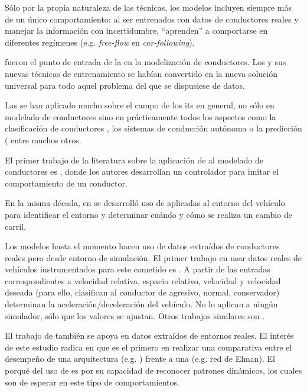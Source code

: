Sólo por la propia naturaleza de las técnicas, los modelos incluyen siempre más de un único comportamiento: al ser entrenados con datos de conductores reales y manejar la información con incertidumbre, \enquote{aprenden} a comportarse en diferentes regímenes (e.g. \textit{\gls{free-flow}} en \textit{\gls{car-following}}).

 fueron el punto de entrada de la  en la modelización de conductores. Los  y sus nuevas técnicas de entrenamiento se habían convertido en la nueva solución universal para todo aquel problema del que se dispusiese de datos.

Las  se han aplicado mucho sobre el campo de los \acrshort{its} en general, no sólo en modelado de conductores sino en prácticamente todos los aspectos como la clasificación de conductores \cite{DiazAlvarez2014}, los sistemas de conducción autónoma \cite{huval2015empirical} o la predicción (\cite{Dougherty1993, chan2012neural} entre muchos otros.

El primer trabajo de la literatura sobre la aplicación de  al modelado de conductores es \cite{Fix1990}, donde los autores desarrollan un controlador para imitar el comportamiento de un conductor.

En la misma década, en \cite{Hunt1994} se desarrolló uso de  aplicadas al entorno del vehículo para identificar el entorno y determinar cuándo y cómo se realiza un cambio de carril.

Los modelos hasta el momento hacen uso de datos extraídos de conductores reales pero desde entorno de simulación. El primer trabajo en usar datos reales de vehículos instrumentados para este cometido es \cite{Jia2003}. A partir de las entradas correspondientes a velocidad relativa, espacio relativo, velocidad y velocidad deseada (para ello, clasifican al conductor de agresivo, normal, conservador) determinan la aceleración/deceleración del vehículo. No lo aplican a ningún simulador, sólo que los valores se ajustan. Otros trabajos similares son \cite{Panwai2007, Khodayari2012}.

El trabajo de \cite{Simonelli2009} también se apoya en datos extraídos de entornos reales. El interés de este estudio radica en que es el primero en realizar una comparativa entre el desempeño de una arquitectura \textit{} (e.g. ) frente a una  (e.g. red de Elman). El porqué del uso de  es por su capacidad de reconocer patrones dinámicos, los cuales son de esperar en este tipo de comportamientos.

